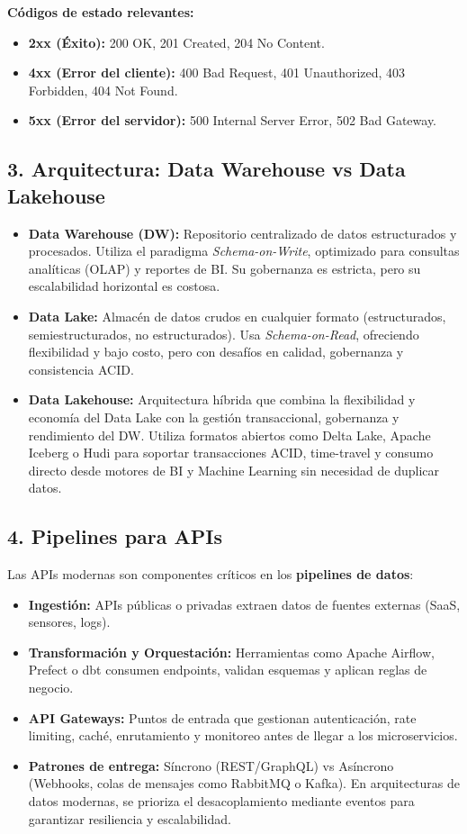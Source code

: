 \documentclass[12pt,a4paper]{article}
\begin{document}
\textbf{Códigos de estado relevantes:}
\begin{itemize}
    \item \textbf{2xx (Éxito):} 200 OK, 201 Created, 204 No Content.
    \item \textbf{4xx (Error del cliente):} 400 Bad Request, 401 Unauthorized, 403 Forbidden, 404 Not Found.
    \item \textbf{5xx (Error del servidor):} 500 Internal Server Error, 502 Bad Gateway.
\end{itemize}

\subsection*{3. Arquitectura: Data Warehouse vs Data Lakehouse}
\begin{itemize}
    \item \textbf{Data Warehouse (DW):} Repositorio centralizado de datos estructurados y procesados. Utiliza el paradigma \textit{Schema-on-Write}, optimizado para consultas analíticas (OLAP) y reportes de BI. Su gobernanza es estricta, pero su escalabilidad horizontal es costosa.
    \item \textbf{Data Lake:} Almacén de datos crudos en cualquier formato (estructurados, semiestructurados, no estructurados). Usa \textit{Schema-on-Read}, ofreciendo flexibilidad y bajo costo, pero con desafíos en calidad, gobernanza y consistencia ACID.
    \item \textbf{Data Lakehouse:} Arquitectura híbrida que combina la flexibilidad y economía del Data Lake con la gestión transaccional, gobernanza y rendimiento del DW. Utiliza formatos abiertos como Delta Lake, Apache Iceberg o Hudi para soportar transacciones ACID, time-travel y consumo directo desde motores de BI y Machine Learning sin necesidad de duplicar datos.
\end{itemize}

\subsection*{4. Pipelines para APIs}
Las APIs modernas son componentes críticos en los \textbf{pipelines de datos}:
\begin{itemize}
    \item \textbf{Ingestión:} APIs públicas o privadas extraen datos de fuentes externas (SaaS, sensores, logs).
    \item \textbf{Transformación y Orquestación:} Herramientas como Apache Airflow, Prefect o dbt consumen endpoints, validan esquemas y aplican reglas de negocio.
    \item \textbf{API Gateways:} Puntos de entrada que gestionan autenticación, rate limiting, caché, enrutamiento y monitoreo antes de llegar a los microservicios.
    \item \textbf{Patrones de entrega:} Síncrono (REST/GraphQL) vs Asíncrono (Webhooks, colas de mensajes como RabbitMQ o Kafka). En arquitecturas de datos modernas, se prioriza el desacoplamiento mediante eventos para garantizar resiliencia y escalabilidad.
\end{itemize}
\end{document}
